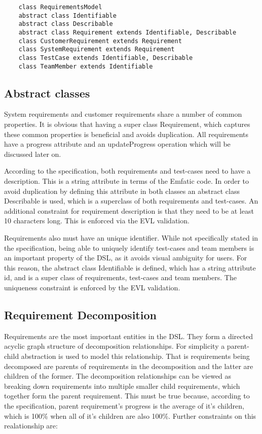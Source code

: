 \documentclass[11pt,a4paper]{scrartcl}
\begin{document}
	\begin{lstlisting}
	class RequirementsModel
	abstract class Identifiable
	abstract class Describable
	abstract class Requirement extends Identifiable, Describable
	class CustomerRequirement extends Requirement
	class SystemRequirement extends Requirement
	class TestCase extends Identifiable, Describable
	class TeamMember extends Identifiable
	\end{lstlisting}
	
	\subsection{Abstract classes}
	System requirements and customer requirements share a number of common properties. It is obvious that having a super class Requirement, which captures these common properties is beneficial and avoids duplication. All requirements have a progress attribute and an updateProgress operation which will be discussed later on.
	
	According to the specification, both requirements and test-cases need to have a description. This is a string attribute in terms of the Emfatic code. In order to avoid duplication by defining this attribute in both classes an abstract class Describable is used, which is a superclass of both requirements and test-cases. An additional constraint for requirement description is that they need to be at least 10 characters long. This is enforced via the EVL validation.
	
	Requirements also must have an unique identifier. While not specifically stated in the specification, being able to uniquely identify test-cases and team members is an important property of the DSL, as it avoids visual ambiguity for users. For this reason, the abstract class Identifiable is defined, which has a string attribute id, and is a super class of requirements, test-cases and team members. The uniqueness constraint is enforced by the EVL validation.
	
	\subsection{Requirement Decomposition}
	Requirements are the most important entities in the DSL. They form a directed acyclic graph structure of decomposition relationships. For simplicity a parent-child abstraction is used to model this relationship. That is requirements being decomposed are parents of requirements in the decomposition and the latter are children of the former. The decomposition relationships can be viewed as breaking down requirements into multiple smaller child requirements, which together form the parent requirement. This must be true because, according to the specification, parent requirement's progress is the average of it's children, which is 100\% when all of it's children are also 100\%. Further constraints on this realationship are:
	
\end{document}

